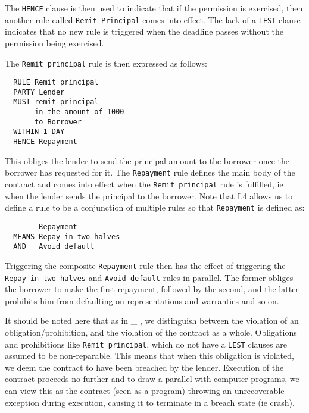 \documentclass{article}
\begin{document}
The \texttt{HENCE} clause is then used to indicate that if the permission is
exercised, then another rule called \texttt{Remit Principal} comes into effect.
The lack of a \texttt{LEST} clause indicates that no new rule is triggered
when the deadline passes without the permission being exercised.

The \texttt{Remit principal} rule is then expressed as follows:

\begin{lstlisting}
  RULE Remit principal		
  PARTY	Lender		
  MUST remit principal
       in the amount of 1000
       to Borrower
  WITHIN 1 DAY
  HENCE	Repayment
\end{lstlisting}

This obliges the lender to send the principal amount to the borrower once
the borrower has requested for it.
The \texttt{Repayment} rule defines the main body of the contract and comes
into effect when the \texttt{Remit principal} rule is fulfilled, ie when the
lender sends the principal to the borrower.
Note that L4 allows us to define a rule to be a conjunction of multiple rules
so that \texttt{Repayment} is defined as:

\begin{lstlisting}
        Repayment
  MEANS Repay in two halves
  AND   Avoid default
\end{lstlisting}

Triggering the composite \texttt{Repayment} rule then has the effect of
triggering the \texttt{Repay in two halves} and \texttt{Avoid default}
rules in parallel.
The former obliges the borrower to make the first repayment, followed by the
second, and the latter prohibits him from defaulting on representations and
warranties and so on.

It should be noted here that as in \_
,
we distinguish between the violation of an obligation/prohibition, and the
violation of the contract as a whole.
Obligations and prohibitions like \texttt{Remit principal}, which do not have
a \texttt{LEST} clauses are assumed to be non-reparable.
This means that when this obligation is violated, we deem the contract to
have been breached by the lender.
Execution of the contract proceeds no further and to draw a parallel with
computer programs, we can view this as the contract (seen as a program)
throwing an unrecoverable exception during execution, causing it to terminate
in a breach state (ie crash).
\end{document}
